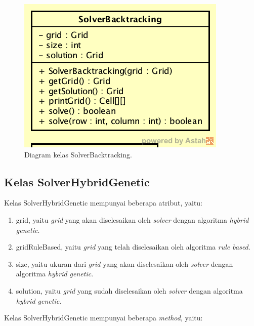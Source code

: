 \begin{figure}
\centering
\captionsetup{justification=centering}
\includegraphics[scale=0.5]{Gambar/Perancangan/DiagramKelasSolverBacktracking.png}
\caption[Diagram kelas SolverBacktracking.]{Diagram kelas SolverBacktracking.}
\label{fig:diagramkelassolverbt}
\end{figure}

\subsection{Kelas SolverHybridGenetic}
\label{sec:kelassolverhg}

Kelas SolverHybridGenetic mempunyai beberapa atribut, yaitu:

\begin{enumerate}
\item grid, yaitu \textit{grid} yang akan diselesaikan oleh \textit{solver} dengan algoritma \textit{hybrid genetic}.
\item gridRuleBased, yaitu \textit{grid} yang telah diselesaikan oleh algoritma \textit{rule based}.
\item size, yaitu ukuran dari \textit{grid} yang akan diselesaikan oleh \textit{solver} dengan algoritma \textit{hybrid genetic}.
\item solution, yaitu \textit{grid} yang sudah diselesaikan oleh \textit{solver} dengan algoritma \textit{hybrid genetic}.
\end{enumerate}

Kelas SolverHybridGenetic mempunyai beberapa \textit{method}, yaitu:

